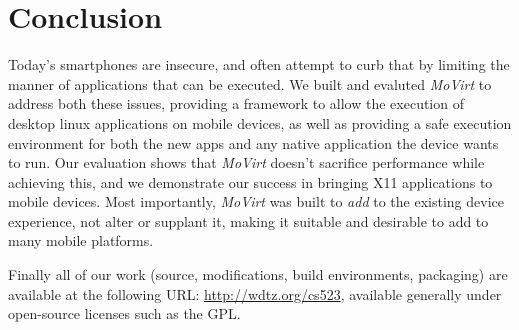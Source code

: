 \section{Conclusion}
\label{sec:conclusion}
Today's smartphones are insecure, and often attempt to curb that by limiting the manner of applications that can be executed.  We built and evaluted \emph{MoVirt} to address both these issues, providing a framework to allow the execution of desktop linux applications on mobile devices, as well as providing a safe execution environment for both the new apps and any native application the device wants to run.  Our evaluation shows that \emph{MoVirt} doesn't sacrifice performance while achieving this, and we demonstrate our success in bringing X11 applications to mobile devices.  Most importantly, \emph{MoVirt} was built to \emph{add} to the existing device experience, not alter or supplant it, making it suitable and desirable to add to many mobile platforms.

Finally all of our work (source, modifications, build environments, packaging) are available at the following URL: \url{http://wdtz.org/cs523}, available generally under open-source licenses such as the GPL.
